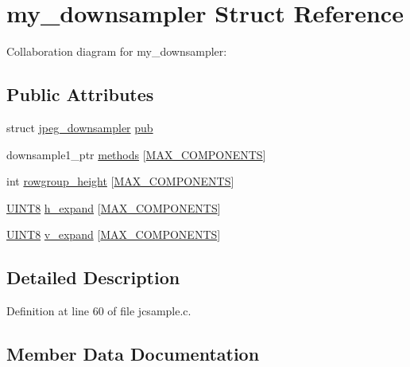 \hypertarget{structmy__downsampler}{}\section{my\+\_\+downsampler Struct Reference}
\label{structmy__downsampler}


Collaboration diagram for my\+\_\+downsampler\+:
\subsection*{Public Attributes}
\begin{DoxyCompactItemize}
\item 
struct \mbox{\hyperlink{structjpeg__downsampler}{jpeg\+\_\+downsampler}} \mbox{\hyperlink{structmy__downsampler_a3ace227dd4fd9fdf8e8fe542ca6503c3}{pub}}
\item 
downsample1\+\_\+ptr \mbox{\hyperlink{structmy__downsampler_a6e74bc63d21fbd97d92dc36f65011a75}{methods}} \mbox{[}\mbox{\hyperlink{jmorecfg_8h_a6d8c910a1fdb6d4762a05f7250e64322}{M\+A\+X\+\_\+\+C\+O\+M\+P\+O\+N\+E\+N\+TS}}\mbox{]}
\item 
int \mbox{\hyperlink{structmy__downsampler_a60c30dd6034e706ee9d21d0f5f198af7}{rowgroup\+\_\+height}} \mbox{[}\mbox{\hyperlink{jmorecfg_8h_a6d8c910a1fdb6d4762a05f7250e64322}{M\+A\+X\+\_\+\+C\+O\+M\+P\+O\+N\+E\+N\+TS}}\mbox{]}
\item 
\mbox{\hyperlink{jmorecfg_8h_adfb9a8ea1dd59f151065f763e1e9acd6}{U\+I\+N\+T8}} \mbox{\hyperlink{structmy__downsampler_a051e236dc44201165b1625621994b86c}{h\+\_\+expand}} \mbox{[}\mbox{\hyperlink{jmorecfg_8h_a6d8c910a1fdb6d4762a05f7250e64322}{M\+A\+X\+\_\+\+C\+O\+M\+P\+O\+N\+E\+N\+TS}}\mbox{]}
\item 
\mbox{\hyperlink{jmorecfg_8h_adfb9a8ea1dd59f151065f763e1e9acd6}{U\+I\+N\+T8}} \mbox{\hyperlink{structmy__downsampler_ab3bc55e23e197c2129ae09c82fb62e83}{v\+\_\+expand}} \mbox{[}\mbox{\hyperlink{jmorecfg_8h_a6d8c910a1fdb6d4762a05f7250e64322}{M\+A\+X\+\_\+\+C\+O\+M\+P\+O\+N\+E\+N\+TS}}\mbox{]}
\end{DoxyCompactItemize}


\subsection{Detailed Description}


Definition at line 60 of file jcsample.\+c.



\subsection{Member Data Documentation}
\mbox{\label{structmy__downsampler_a051e236dc44201165b1625621994b86c}} 
